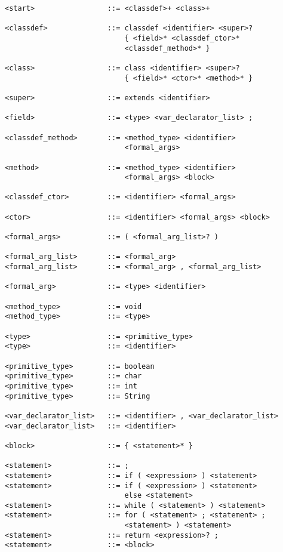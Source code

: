 \documentclass [a4paper,titlepage]{report}
\begin{document}
\begin{verbatim}
<start>                 ::= <classdef>+ <class>+

<classdef>              ::= classdef <identifier> <super>? 
                            { <field>* <classdef_ctor>* 
                            <classdef_method>* }

<class>                 ::= class <identifier> <super>? 
                            { <field>* <ctor>* <method>* }

<super>                 ::= extends <identifier>

<field>                 ::= <type> <var_declarator_list> ;

<classdef_method>       ::= <method_type> <identifier> 
                            <formal_args>

<method>                ::= <method_type> <identifier> 
                            <formal_args> <block>

<classdef_ctor>         ::= <identifier> <formal_args>

<ctor>                  ::= <identifier> <formal_args> <block>

<formal_args>           ::= ( <formal_arg_list>? )

<formal_arg_list>       ::= <formal_arg>
<formal_arg_list>       ::= <formal_arg> , <formal_arg_list>

<formal_arg>            ::= <type> <identifier>

<method_type>           ::= void
<method_type>           ::= <type>

<type>                  ::= <primitive_type>
<type>                  ::= <identifier>

<primitive_type>        ::= boolean
<primitive_type>        ::= char
<primitive_type>        ::= int
<primitive_type>        ::= String

<var_declarator_list>   ::= <identifier> , <var_declarator_list>
<var_declarator_list>   ::= <identifier>

<block>                 ::= { <statement>* }

<statement>             ::= ;
<statement>             ::= if ( <expression> ) <statement>
<statement>             ::= if ( <expression> ) <statement> 
                            else <statement>
<statement>             ::= while ( <statement> ) <statement>
<statement>             ::= for ( <statement> ; <statement> ; 
                            <statement> ) <statement>
<statement>             ::= return <expression>? ;
<statement>             ::= <block>


\end{verbatim}
\end{document}
